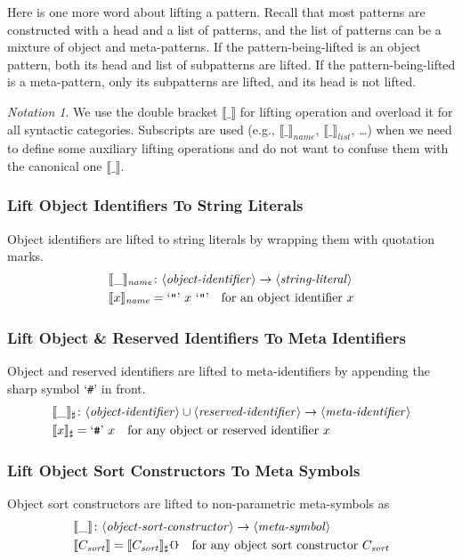 \documentclass[UTF8,11pt]{article}
\newcounter{thmcounter}
\theoremstyle{plain}
\theoremstyle{definition}
\theoremstyle{remark}
\newtheorem{notation}   [thmcounter]{Notation}
\newcommand{\parametric}[2]{{#1}\raisebox{.2ex}{\texttt{\footnotesize{\{}}}#2\raisebox{.2ex}{\texttt{\footnotesize{\}}}}}
\newcommand{\denote}[1]{\llbracket{#1}\rrbracket}
\newcommand{\sharpsymbol}{\#}
\newcommand{\quottt}[1]{\textrm{\lq\texttt{#1}\rq}}
\newcommand{\name}{\mathit{name}}
\newcommand{\llist}{\mathit{list}}
\newcommand{\itsort}{\mathit{sort}}
\newcommand{\syntacc}[1]{\text{$\langle$\textit{#1}$\rangle$}}
\begin{document}
Here is one more word about lifting a pattern.
Recall that most patterns are constructed with a head and a list of patterns, 
and the list of patterns can be a mixture of object and meta-patterns.
If the pattern-being-lifted is an object pattern, both its head and list of 
subpatterns are lifted. 
If the pattern-being-lifted is a meta-pattern, only its subpatterns are lifted, 
and its head is not lifted.

\begin{notation}
	We use the double bracket $\denote{\_}$ for lifting operation and overload 
	it for all syntactic categories.
	Subscripts are used (e.g., $\denote{\_}_\name$, $\denote{\_}_\llist$, 
	\dots) when we need 
	to define some auxiliary lifting operations and do not want to confuse them 
	with the canonical one  $\denote{\_}$.
\end{notation}

\subsubsection{Lift Object Identifiers To String Literals}
Object identifiers are lifted to string literals by wrapping them with 
quotation marks.
\begin{align*}
&\denote{\_}_\name \colon \syntacc{object-identifier} \to 
\syntacc{string-literal} \\
&\denote{x}_\name = \quottt{"} \ x \  \quottt{"} \quad \text{for an object 
identifier $x$}
\end{align*}


\subsubsection{Lift Object \& Reserved Identifiers To Meta Identifiers}
Object and reserved identifiers are lifted to meta-identifiers by appending the 
sharp symbol \quottt{\sharpsymbol} in front.
\begin{align*}
&\denote{\_}_\sharp \colon \syntacc{object-identifier} \cup 
\syntacc{reserved-identifier} \to 
\syntacc{meta-identifier} \\
&\denote{x}_\sharp = \quottt{\sharpsymbol} \ x \quad \text{for any object or 
reserved identifier $x$}
\end{align*}

\subsubsection{Lift Object Sort Constructors To Meta Symbols}
Object sort constructors are lifted to non-parametric meta-symbols 
as
\begin{align*}
& \denote{\_} \colon \syntacc{object-sort-constructor} \to \syntacc{meta-symbol}
\\
& \denote{C_\itsort} = \parametric{\denote{C_\itsort}_\sharp}{} \quad \text{for 
any object sort constructor $C_\itsort$}
\end{align*}
\end{document}
